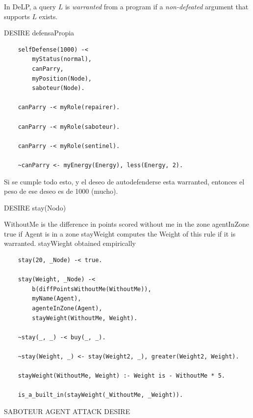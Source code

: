     In DeLP, a query $L$ is \emph{warranted} from a program if a \emph{non-defeated}
    argument that supports $L$ exists. %
    
    DESIRE defensaPropia
    
    \begin{small}
    \begin{Verbatim}
    selfDefense(1000) -<
        myStatus(normal),
        canParry,
        myPosition(Node),
        saboteur(Node).  

    canParry -< myRole(repairer).
        
    canParry -< myRole(saboteur).
        
    canParry -< myRole(sentinel).
        
    ~canParry <- myEnergy(Energy), less(Energy, 2). 
    \end{Verbatim}
    \end{small}
 
    Si se cumple todo esto, y el deseo de autodefenderse esta warranted,
    entonces el peso de ese deseo es de 1000 (mucho).

    DESIRE stay(Nodo)

    WithoutMe is the difference in points scored without me in the zone 
    agentInZone true if Agent is in a zone                                          
    stayWeight computes the Weight of this rule if it is warranted.                
    stayWieght obtained empirically

    \begin{small}
    \begin{verbatim}
    stay(20, _Node) -< true.

    stay(Weight, _Node) -< 
        b(diffPointsWithoutMe(WithoutMe)),
        myName(Agent),                    
        agenteInZone(Agent),              
        stayWeight(WithoutMe, Weight).    

    ~stay(_, _) -< buy(_, _).

    ~stay(Weight, _) <- stay(Weight2, _), greater(Weight2, Weight).

    stayWeight(WithoutMe, Weight) :- Weight is - WithoutMe * 5.
        
    is_a_built_in(stayWeight(_WithoutMe, _Weight)).
    \end{verbatim}
    \end{small}

    SABOTEUR AGENT ATTACK DESIRE

